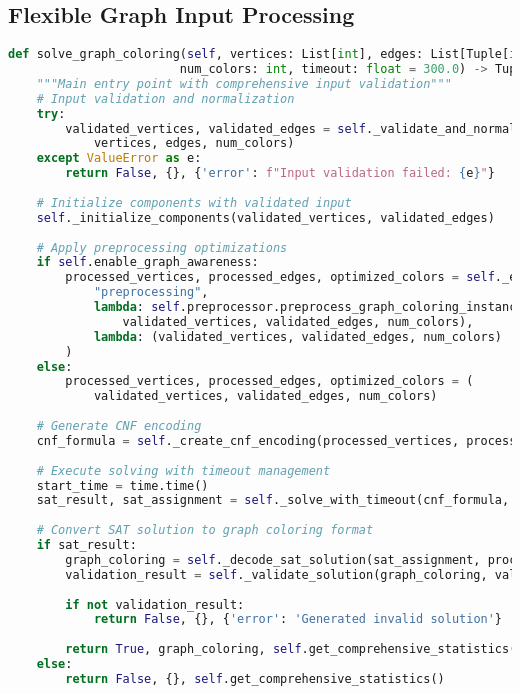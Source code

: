 \subsection{Flexible Graph Input Processing}
\label{appendix:input-processing}

\begin{lstlisting}[language=Python, caption=Flexible Graph Input Processing]
def solve_graph_coloring(self, vertices: List[int], edges: List[Tuple[int, int]], 
                        num_colors: int, timeout: float = 300.0) -> Tuple[bool, Dict[int, int], Dict]:
    """Main entry point with comprehensive input validation"""
    # Input validation and normalization
    try:
        validated_vertices, validated_edges = self._validate_and_normalize_input(
            vertices, edges, num_colors)
    except ValueError as e:
        return False, {}, {'error': f"Input validation failed: {e}"}
    
    # Initialize components with validated input
    self._initialize_components(validated_vertices, validated_edges)
    
    # Apply preprocessing optimizations
    if self.enable_graph_awareness:
        processed_vertices, processed_edges, optimized_colors = self._execute_with_fallback(
            "preprocessing", 
            lambda: self.preprocessor.preprocess_graph_coloring_instance(
                validated_vertices, validated_edges, num_colors),
            lambda: (validated_vertices, validated_edges, num_colors)
        )
    else:
        processed_vertices, processed_edges, optimized_colors = (
            validated_vertices, validated_edges, num_colors)
    
    # Generate CNF encoding
    cnf_formula = self._create_cnf_encoding(processed_vertices, processed_edges, optimized_colors)
    
    # Execute solving with timeout management
    start_time = time.time()
    sat_result, sat_assignment = self._solve_with_timeout(cnf_formula, timeout, start_time)
    
    # Convert SAT solution to graph coloring format
    if sat_result:
        graph_coloring = self._decode_sat_solution(sat_assignment, processed_vertices, optimized_colors)
        validation_result = self._validate_solution(graph_coloring, validated_edges)
        
        if not validation_result:
            return False, {}, {'error': 'Generated invalid solution'}
        
        return True, graph_coloring, self.get_comprehensive_statistics()
    else:
        return False, {}, self.get_comprehensive_statistics()
\end{lstlisting}

